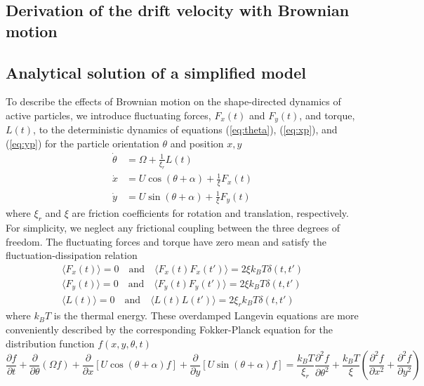 \begin{appendices}
\clearpage
\section{Derivation of the drift velocity with Brownian motion}

\subsection{Analytical solution of a simplified model}

To describe the effects of Brownian motion on the shape-directed dynamics of active particles, we introduce fluctuating forces, $F_x(t)$ and $F_y(t)$, and torque, $L(t)$, to the deterministic dynamics of equations (\ref{eq:theta}), (\ref{eq:xp}), and (\ref{eq:yp}) for the particle orientation $\theta$ and position $x,y$
\begin{align}
    \dot{\theta} &= \Omega + \frac{1}{\xi_r}L(t) \label{eq:langevin1}
    \\ 
    \dot{x} &= U \cos(\theta + \alpha)  + \frac{1}{\xi}F_x(t)  
    \\ 
    \dot{y} &= U \sin(\theta + \alpha) + \frac{1}{\xi}F_y(t) \label{eq:langevin3}
\end{align}	
where $\xi_r$ and $\xi$ are friction coefficients for rotation and translation, respectively.  For simplicity, we neglect any frictional coupling between the three degrees of freedom.  The fluctuating forces and torque have zero mean and satisfy the fluctuation-dissipation relation
\begin{gather}
    \langle F_x(t) \rangle = 0 \quad \text{and} \quad \langle F_x(t)F_x(t') \rangle = 2\xi k_B T\delta(t,t')
    \\
    \langle F_y(t) \rangle = 0 \quad \text{and} \quad \langle F_y(t)F_y(t') \rangle = 2\xi k_B T\delta(t,t')
    \\
    \langle L(t) \rangle = 0 \quad \text{and} \quad \langle L(t)L(t') \rangle = 2\xi_r k_B T\delta(t,t')
\end{gather}
where $k_B T$ is the thermal energy.  These overdamped Langevin equations are more conveniently described by the corresponding Fokker-Planck equation for the distribution function $f(x,y,\theta,t)$
\begin{equation}
    \frac{\partial f}{\partial t} + \frac{\partial}{\partial \theta}(\Omega f) + \frac{\partial}{\partial x}\left[ U \cos(\theta+\alpha)f\right] + \frac{\partial}{\partial y}\left[ U \sin(\theta+\alpha)f\right] =  \frac{k_B T}{\xi_r}\frac{\partial^2f}{\partial \theta^2} + \frac{k_B T}{\xi} \left(\frac{\partial^2 f}{\partial x^2}+ \frac{\partial^2 f}{\partial y^2}\right)
\end{equation}


\end{appendices}
